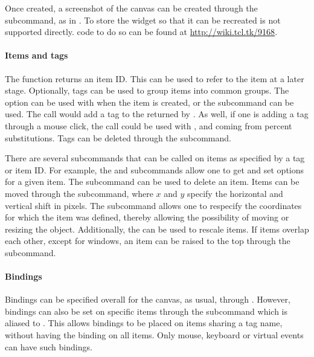 Once created, a screenshot of the canvas can be created through the  subcommand, as in . To store the widget so that it can be recreated is not supported directly. \TCL\/ code to do so can be found at \url{http://wiki.tcl.tk/9168}.


\paragraph{Items and tags}
The  function returns an item ID. This can be
used to refer to the item at a later stage. Optionally, tags can be
used to group items into common groups. The  option can be
used with  when the item is created, or the
 subcommand can be used. The call
 would add a tag to
the  returned by . As well, if one is
adding a tag through a mouse click, the call  could be used with , 
and  coming from percent substitutions. Tags can be deleted
through the  subcommand.

There are several subcommands that can be called on items as specified
by a tag or item ID. For example, the 
and  subcommands allow one to get
and set options for a given item. The
 subcommand can be used to
delete an item. Items can be moved through the
 subcommand, where $x$
and $y$ specify the horizontal and vertical shift in pixels. The
subcommand 
allows one to respecify the coordinates for which the item was
defined, thereby allowing the possibility of moving or resizing the
object. Additionally, the  can be used to
rescale items. If items overlap each other, except for windows, an
item can be raised to the top through the
 subcommand.



\paragraph{Bindings}
Bindings can be specified overall for the canvas, as usual, through
. However, bindings can also be set on specific items
through the subcommand  which is aliased to . This allows
bindings to be placed on items sharing a tag name, without having the
binding on all items. Only mouse, keyboard or virtual events can have
such bindings.

